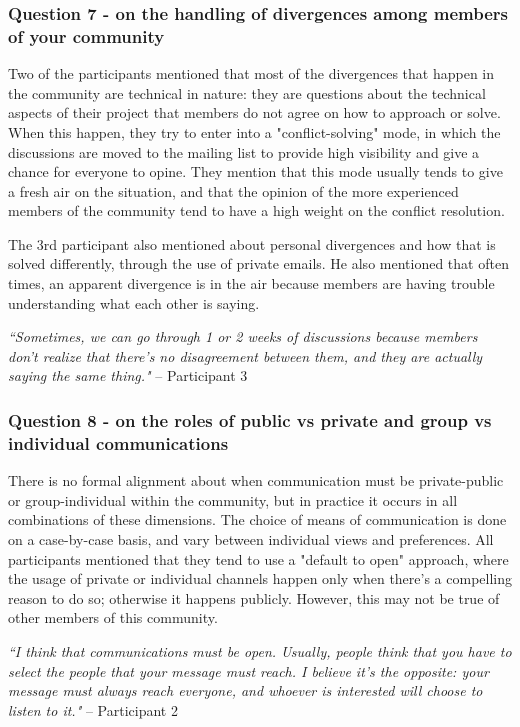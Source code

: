 \documentclass{sigchi}
\begin{document}
\subsubsection{Question 7 - on the handling of divergences among members of your community}
Two of the participants mentioned that most of the divergences that happen in the community are technical in nature: they are questions about the technical aspects of their project that members do not agree on how to approach or solve. When this happen, they try to enter into a "conflict-solving" mode, in which the discussions are moved to the mailing list to provide high visibility and give a chance for everyone to opine. They mention that this mode usually tends to give a fresh air on the situation, and that the opinion of the more experienced members of the community tend to have a high weight on the conflict resolution.

The 3rd participant also mentioned about personal divergences and how that is solved differently, through the use of private emails. He also mentioned that often times, an apparent divergence is in the air because members are having trouble understanding what each other is saying.

\begin{displayquote}
\textit{``Sometimes, we can go through 1 or 2 weeks of discussions because members don't realize that there's no disagreement between them, and they are actually saying the same thing."} – Participant 3
\end{displayquote}

\subsubsection{Question 8 - on the roles of public vs private and group vs individual communications}

There is no formal alignment about when communication must be private-public or group-individual within the community, but in practice it occurs in all combinations of these dimensions. The choice of means of communication is done on a case-by-case basis, and vary between individual views and preferences. All participants mentioned that they tend to use a "default to open" approach, where the usage of private or individual channels happen only when there's a compelling reason to do so; otherwise it happens publicly. However, this may not be true of other members of this community.

\begin{displayquote}
\textit{``I think that communications must be open. Usually, people think that you have to select the people that your message must reach. I believe it's the opposite: your message must always reach everyone, and whoever is interested will choose to listen to it."} – Participant 2
\end{displayquote}
\end{document}
